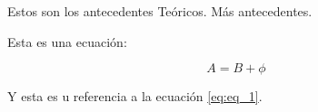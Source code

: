 Estos son los antecedentes Teóricos. Más antecedentes.

Esta es una ecuación:

\begin{equation}
	A = B + \phi
	\label{eq:eq_1}
\end{equation}

Y esta es u referencia a la ecuación \eqref{eq:eq_1}. 